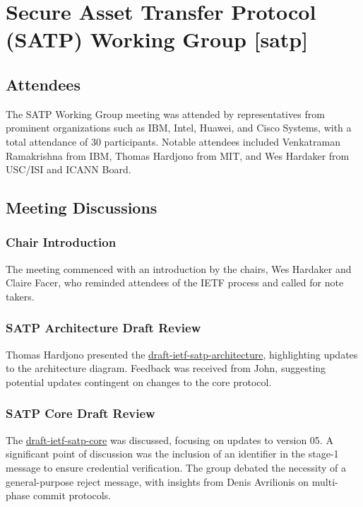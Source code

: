 \documentclass{article}
\begin{document}
\newpage

\section{Secure Asset Transfer Protocol (SATP) Working Group [satp]}

\subsection{Attendees}
The SATP Working Group meeting was attended by representatives from prominent organizations such as IBM, Intel, Huawei, and Cisco Systems, with a total attendance of 30 participants. Notable attendees included Venkatraman Ramakrishna from IBM, Thomas Hardjono from MIT, and Wes Hardaker from USC/ISI and ICANN Board.

\subsection{Meeting Discussions}

\subsubsection{Chair Introduction}
The meeting commenced with an introduction by the chairs, Wes Hardaker and Claire Facer, who reminded attendees of the IETF process and called for note takers.

\subsubsection{SATP Architecture Draft Review}
Thomas Hardjono presented the \href{https://datatracker.ietf.org/doc/html/draft-ietf-satp-architecture}{draft-ietf-satp-architecture}, highlighting updates to the architecture diagram. Feedback was received from John, suggesting potential updates contingent on changes to the core protocol.

\subsubsection{SATP Core Draft Review}
The \href{https://datatracker.ietf.org/doc/html/draft-ietf-satp-core}{draft-ietf-satp-core} was discussed, focusing on updates to version 05. A significant point of discussion was the inclusion of an identifier in the stage-1 message to ensure credential verification. The group debated the necessity of a general-purpose reject message, with insights from Denis Avrilionis on multi-phase commit protocols.
\end{document}
